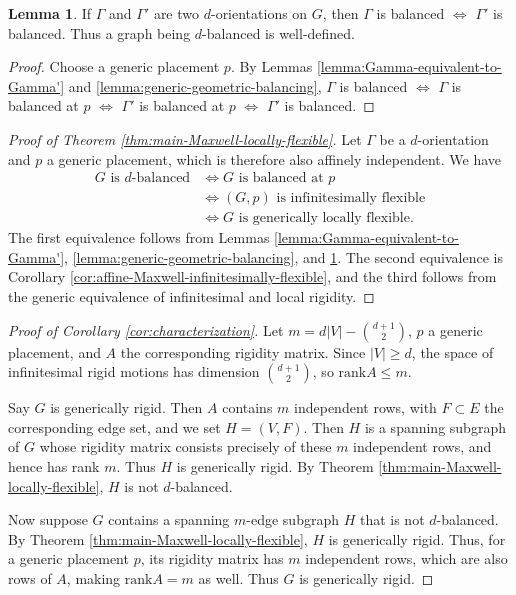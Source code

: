 \documentclass[11pt,letterpaper]{amsart}
\theoremstyle{definition}
\newtheorem{lemma}{Lemma}
\begin{document}
\begin{lemma}\label{lemma:generic-orientation-independent}
    If $\Gamma$ and $\Gamma'$ are two $d$-orientations on $G$, then $\Gamma$ is balanced $\iff$ $\Gamma'$ is balanced. Thus a graph being $d$-balanced is well-defined.
\end{lemma}

\begin{proof}
    Choose a generic placement $p$.  By Lemmas \ref{lemma:Gamma-equivalent-to-Gamma'} and \ref{lemma:generic-geometric-balancing}, $\Gamma$ is balanced $\iff$ $\Gamma$ is balanced at $p$ $\iff$ $\Gamma'$ is balanced at $p$ $\iff$ $\Gamma'$ is balanced.
\end{proof}


\begin{proof}[Proof of Theorem \ref{thm:main-Maxwell-locally-flexible}]
    Let $\Gamma$ be a $d$-orientation and $p$ a generic placement, which is therefore also affinely independent. We have
\begin{align*}
    G \text{ is } d\text{-balanced} & \iff G \text{ is balanced at } p \\
    & \iff (G,p) \text{ is infinitesimally flexible} \\
    & \iff G \text{ is generically locally flexible.}
\end{align*}
The first equivalence follows from Lemmas \ref{lemma:Gamma-equivalent-to-Gamma'}, \ref{lemma:generic-geometric-balancing}, and \ref{lemma:generic-orientation-independent}. The second equivalence is Corollary \ref{cor:affine-Maxwell-infinitesimally-flexible}, and the third follows from the generic equivalence of infinitesimal and local rigidity.
\end{proof}

\begin{proof}[Proof of Corollary \ref{cor:characterization}]
    Let $m=d|V|-\binom{d+1}{2}$, $p$ a generic placement, and $A$ the corresponding rigidity matrix. Since $|V|\geq d$, the space of infinitesimal rigid motions has dimension $\binom{d+1}{2}$, so $\text{rank} A \leq m$. 
    
    Say $G$ is generically rigid. Then $A$ contains $m$ independent rows, with $F \subset E$ the corresponding edge set, and we set $H=(V,F)$. Then $H$ is a spanning subgraph of $G$ whose rigidity matrix consists precisely of these $m$ independent rows, and hence has rank $m$. Thus $H$ is generically rigid. By Theorem \ref{thm:main-Maxwell-locally-flexible}, $H$ is not
    $d$-balanced.

    Now suppose $G$ contains a spanning $m$-edge subgraph $H$ that is not $d$-balanced.  By Theorem \ref{thm:main-Maxwell-locally-flexible}, $H$ is generically rigid.  Thus, for a generic placement $p$, its rigidity matrix has $m$ independent rows, which are also rows of $A$, making $\text{rank} A = m$ as well. Thus $G$ is generically rigid.
\end{proof}
\end{document}
